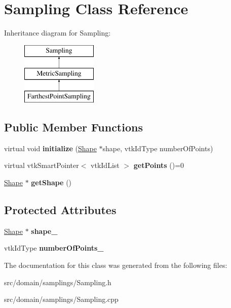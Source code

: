 \hypertarget{class_sampling}{}\section{Sampling Class Reference}
\label{class_sampling}
Inheritance diagram for Sampling\+:\begin{figure}[H]
\begin{center}
\leavevmode
\includegraphics[height=3.000000cm]{class_sampling}
\end{center}
\end{figure}
\subsection*{Public Member Functions}
\begin{DoxyCompactItemize}
\item 
\hypertarget{class_sampling_a7bdabbf5afa860cf22b616acfd1c80c4}{}virtual void {\bfseries initialize} (\hyperlink{class_shape}{Shape} $\ast$shape, vtk\+Id\+Type number\+Of\+Points)\label{class_sampling_a7bdabbf5afa860cf22b616acfd1c80c4}

\item 
\hypertarget{class_sampling_af696e2f26de2992ec95b1711c71875e5}{}virtual vtk\+Smart\+Pointer$<$ vtk\+Id\+List $>$ {\bfseries get\+Points} ()=0\label{class_sampling_af696e2f26de2992ec95b1711c71875e5}

\item 
\hypertarget{class_sampling_a94772f103884bf1ee7f43f1b004af348}{}\hyperlink{class_shape}{Shape} $\ast$ {\bfseries get\+Shape} ()\label{class_sampling_a94772f103884bf1ee7f43f1b004af348}

\end{DoxyCompactItemize}
\subsection*{Protected Attributes}
\begin{DoxyCompactItemize}
\item 
\hypertarget{class_sampling_a62c2dee04abe78238613e5c6d7a38256}{}\hyperlink{class_shape}{Shape} $\ast$ {\bfseries shape\+\_\+}\label{class_sampling_a62c2dee04abe78238613e5c6d7a38256}

\item 
\hypertarget{class_sampling_a76155df4d929d58e47835a89142bb358}{}vtk\+Id\+Type {\bfseries number\+Of\+Points\+\_\+}\label{class_sampling_a76155df4d929d58e47835a89142bb358}

\end{DoxyCompactItemize}


The documentation for this class was generated from the following files\+:\begin{DoxyCompactItemize}
\item 
src/domain/samplings/Sampling.\+h\item 
src/domain/samplings/Sampling.\+cpp\end{DoxyCompactItemize}
